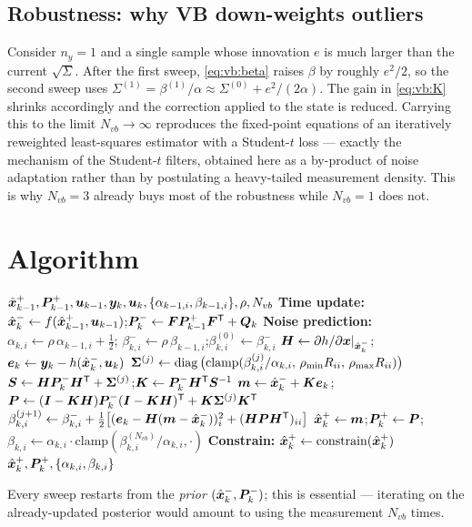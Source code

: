 \subsection{Robustness: why VB down-weights outliers}
Consider $n_y=1$ and a single sample whose innovation $e$ is much larger than the current
$\sqrt{\Sigma}$.  After the first sweep, \eqref{eq:vb:beta} raises $\beta$ by roughly $e^2/2$, so the
second sweep uses $\Sigma^{(1)}=\beta^{(1)}/\alpha \approx \Sigma^{(0)} + e^2/(2\alpha)$.  The gain
in \eqref{eq:vb:K} shrinks accordingly and the correction applied to the state is reduced.  Carrying
this to the limit $N_{vb}\to\infty$ reproduces the fixed-point equations of an iteratively
reweighted least-squares estimator with a Student-$t$ loss --- exactly the mechanism of the
Student-$t$ filters, obtained here as a by-product of noise adaptation rather than by postulating a
heavy-tailed measurement density.  This is why $N_{vb}=3$ already buys most of the robustness while
$N_{vb}=1$ does not.

\section{Algorithm}
\begin{algorithm}[H]
\caption{VB-AKF --- one sampling period}
\begin{algorithmic}[1]
\Require $\hat{\bm{x}}^{+}_{k-1},\bm{P}^{+}_{k-1},\bm{u}_{k-1},\bm{y}_k,\bm{u}_k,\{\alpha_{k-1,i},\beta_{k-1,i}\},\rho,N_{vb}$
\State \textbf{Time update:} $\hat{\bm{x}}^{-}_k\gets f(\hat{\bm{x}}^{+}_{k-1},\bm{u}_{k-1})$;\quad $\bm{P}^{-}_k\gets\bm{F}\bm{P}^{+}_{k-1}\bm{F}^{\mathsf{T}}+\bm{Q}_k$
\State \textbf{Noise prediction:} $\alpha_{k,i}\gets\rho\,\alpha_{k-1,i}+\tfrac12$;\quad
       $\beta^-_{k,i}\gets\rho\,\beta_{k-1,i}$;\quad $\beta^{(0)}_{k,i}\gets\beta^-_{k,i}$
\State $\bm{H}\gets\partial h/\partial\bm{x}|_{\hat{\bm{x}}^{-}_k}$;\quad $\bm{e}_k\gets\bm{y}_k-h(\hat{\bm{x}}^{-}_k,\bm{u}_k)$
  \State $\bm\Sigma^{(j)}\gets\operatorname{diag}\big(\mathrm{clamp}(\beta^{(j)}_{k,i}/\alpha_{k,i},\,\rho_{\min}R_{ii},\,\rho_{\max}R_{ii})\big)$
  \State $\bm{S}\gets\bm{H}\bm{P}^{-}_k\bm{H}^{\mathsf{T}}+\bm\Sigma^{(j)}$;\quad $\bm{K}\gets\bm{P}^{-}_k\bm{H}^{\mathsf{T}}\bm{S}^{-1}$
  \State $\bm m\gets\hat{\bm{x}}^{-}_k+\bm{K}\bm{e}_k$;\quad
         $\bm{P}\gets(\bm{I}-\bm{K}\bm{H})\bm{P}^{-}_k(\bm{I}-\bm{K}\bm{H})^{\mathsf{T}}+\bm{K}\bm\Sigma^{(j)}\bm{K}^{\mathsf{T}}$
  \State $\beta^{(j+1)}_{k,i}\gets\beta^-_{k,i}+\tfrac12\big[(\bm{e}_k-\bm{H}(\bm m-\hat{\bm{x}}^{-}_k))_i^2+(\bm{H}\bm{P}\bm{H}^{\mathsf{T}})_{ii}\big]$
\EndFor
\State $\hat{\bm{x}}^{+}_k\gets\bm m$;\quad $\bm{P}^{+}_k\gets\bm{P}$;\quad $\beta_{k,i}\gets\alpha_{k,i}\cdot\mathrm{clamp}(\beta^{(N_{vb})}_{k,i}/\alpha_{k,i},\cdot)$
\State \textbf{Constrain:} $\hat{\bm{x}}^{+}_k\gets\mathrm{constrain}(\hat{\bm{x}}^{+}_k)$
\Ensure $\hat{\bm{x}}^{+}_k,\bm{P}^{+}_k,\{\alpha_{k,i},\beta_{k,i}\}$
\end{algorithmic}
\end{algorithm}
Every sweep restarts from the \emph{prior} $(\hat{\bm{x}}^{-}_k,\bm{P}^{-}_k)$; this is essential --- iterating
on the already-updated posterior would amount to using the measurement $N_{vb}$ times.

